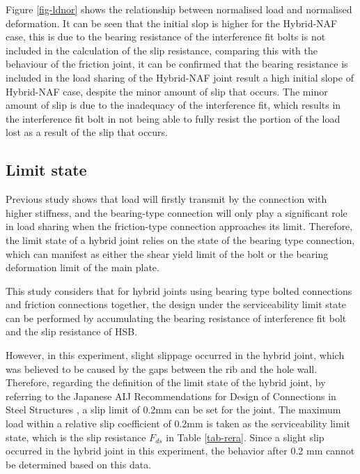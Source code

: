 Figure \ref{fig-ldnor} shows the relationship between normalised load and normalised deformation. It can be seen that the initial slop is higher for the Hybrid-NAF case, this is due to the bearing resistance of the interference fit bolts is not included in the calculation of the slip resistance, comparing this with the behaviour of the friction joint, it can be confirmed that the bearing resistance is included in the load sharing of the Hybrid-NAF joint result a high initial slope of Hybrid-NAF case, despite the minor amount of slip that occurs. The minor amount of slip is due to the inadequacy of the interference fit,  which results in the interference fit bolt in not being able to fully resist the portion of the load lost as a result of the slip that occurs. 


\subsection{Limit state}

Previous study \cite{fisher1965behavior} shows that load will firstly transmit by the connection with higher stiffness, and the bearing-type connection will only play a significant role in load sharing when the friction-type connection approaches its limit. Therefore, the limit state of a hybrid joint relies on the state of the bearing type connection, which can manifest as either the shear yield limit of the bolt or the bearing deformation limit of the main plate.

This study considers that for hybrid joints using bearing type bolted connections and friction connections together, the design under the serviceability limit state can be performed by accumulating the bearing resistance of interference fit bolt and the slip resistance of HSB.

However, in this experiment, slight slippage occurred in the hybrid joint, which was believed to be caused by the gaps between the rib and the hole wall. Therefore, regarding the definition of the limit state of the hybrid joint, by referring to the Japanese AIJ Recommendations for Design of Connections in Steel Structures \cite{2012AIJStructures}, a slip limit of 0.2mm can be set for the joint. The maximum load within a relative slip coefficient of 0.2mm is taken as the serviceability limit state, which is the slip resistance $F_{ds}$ in Table \ref{tab-rera}. Since a slight slip occurred in the hybrid joint in this experiment, the behavior after 0.2 mm cannot be determined based on this data. 

